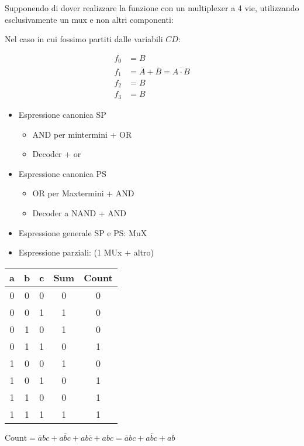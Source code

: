 \documentclass{article}
\begin{document}
Supponendo di dover realizzare la funzione con un multiplexer a 4 vie, utilizzando esclusivamente un mux e non altri componenti:


Nel caso in cui fossimo partiti dalle variabili $CD$:

\[
    \begin{split}
        f_0 &= B\\
        f_1 &= \overline{A} + \overline{B} = \overline{A\cdot B}\\
        f_2 &= B\\
        f_3 &= B
    \end{split}
\]

\begin{itemize}
    \item Espressione canonica SP
        \begin{itemize}
            \item AND per mintermini + OR
            \item Decoder + or
        \end{itemize}
    \item Espressione canonica PS
        \begin{itemize}
            \item OR per Maxtermini + AND
            \item Decoder a NAND + AND
        \end{itemize}
    \item Espressione generale SP e PS: MuX
    \item Espressione parziali: (1 MUx + altro)
\end{itemize}

\begin{tabular}{c c c| c c}
    a & b & c & Sum & Count\\
    \hline
    0 & 0 & 0 & 0 & 0\\
    0 & 0 & 1 & 1 & 0\\
    0 & 1 & 0 & 1 & 0\\
    0 & 1 & 1 & 0 & 1\\
    1 & 0 & 0 & 1 & 0\\
    1 & 0 & 1 & 0 & 1\\
    1 & 1 & 0 & 0 & 1\\
    1 & 1 & 1 & 1 & 1\\
\end{tabular}


$\text{Count} = \overline{a}b c + a\overline{b} c + a b \overline{c} + a b c = \overline{a} b c + a \overline{b} c + ab$
\end{document}
